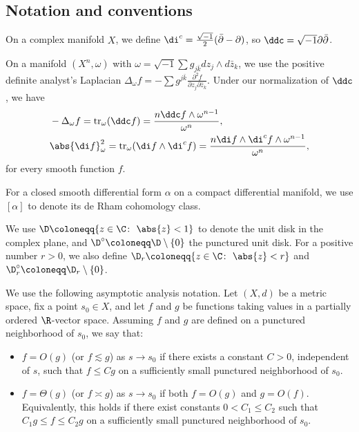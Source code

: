 \documentclass[12pt]{amsart}
\begin{document}
\subsection*{Notation and conventions}  
On a complex manifold $X$, we define 
${\di}^c = \frac{\sqrt{-1}}{2}(\bar{\partial} - \partial)$, 
so $\ddc = \sqrt{-1}\partial\bar{\partial}$.

On a \Kahler manifold $(X^n, \omega)$ with $\omega = \sqrt{-1} \sum g_{j\bar{k}} dz_j \wedge d\bar{z}_k$, we use the positive definite analyst's Laplacian $\Delta_{\omega} f = - \sum g^{j\bar{k}} \frac{\partial^2 f}{\partial z_j \partial \bar{z}_k}$. Under our normalization of $\ddc$, we have
\begin{align*}
    &-\Delta_\omega f = \operatorname{tr}_{\omega}(\ddc f) = \frac{n \ddc f \wedge \omega^{n-1}}{\omega^{n}},\\
    &\abs{\di f}^2_\omega = \operatorname{tr}_{\omega}(\di f \wedge
    \di^c f) = \frac{n \di f \wedge \di^c f\wedge \omega^{n-1}}{\omega^{n}},
\end{align*}
for every smooth function $f$.

For a closed smooth differential form $\alpha$ on a compact differential manifold,
we use $[\alpha]$ to denote its de Rham cohomology class.

We use $\D \coloneqq \{z \in \C \colon\ \abs{z} < 1\}$ to denote the unit disk in the complex plane, and $\D^\circ \coloneqq \D\setminus \{0\}$ 
the punctured unit disk. For a positive number $r > 0$, we also 
define $\D_r \coloneqq \{z \in \C \colon\ \abs{z} < r\}$ and 
$\D_r^\circ \coloneqq \D_r \setminus \{0\}$.

We use the following asymptotic analysis notation. 
Let $(X, d)$ be a metric space, fix a point $s_0 \in X$, 
and let $f$ and $g$ be functions taking values in a partially 
ordered $\R$-vector space. 
Assuming $f$ and $g$ are defined on a punctured neighborhood of 
$s_0$, we say that:
\begin{itemize}
    \item $f = O(g)$ (or $f \lesssim g$) as $s \to s_0$ if there 
    exists a constant $C > 0$, independent of $s$, such that 
    $f \leq C g$ on a sufficiently small punctured neighborhood of $s_0$.
    \item $f = \Theta(g)$ (or $f \asymp g$) as $s \to s_0$ if both 
    $f = O(g)$ and $g = O(f)$. Equivalently, this holds if there 
    exist constants $0 < C_1 \leq C_2$ such that $C_1 g \leq f \leq 
    C_2 g$ on a sufficiently small punctured neighborhood of $s_0$.
\end{itemize}
\end{document}
